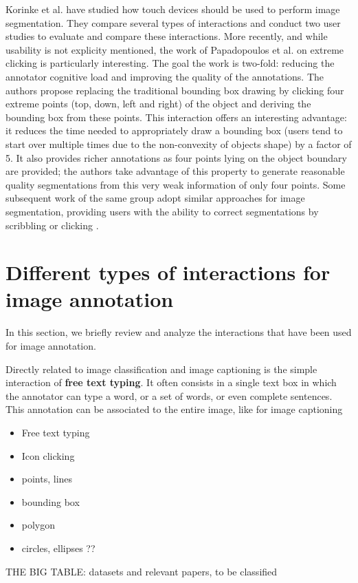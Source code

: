 Korinke et al. \cite{korinke_intuitive_2015,korinke_exploring_2015} have studied how touch devices should be used to perform image segmentation. They compare several types of interactions and conduct two user studies to evaluate and compare these interactions. More recently, and while usability is not explicity mentioned, the work of Papadopoulos et al. \cite{papadopoulos2017extreme} on extreme clicking is particularly interesting. The goal the work is two-fold: reducing the annotator cognitive load and improving the quality of the annotations. The authors propose replacing the traditional bounding box drawing by clicking four extreme points (top, down, left and right)  of the object and deriving the bounding box from these points. This interaction offers an interesting advantage: it reduces the time needed to appropriately draw a bounding box (users tend to start over multiple times due to the non-convexity of objects shape) by a factor of 5. It also provides richer annotations as four points lying on the object boundary are provided; the authors take advantage of this property to generate reasonable quality segmentations from this very weak information of only four points. Some subsequent work of the same group adopt similar approaches for image segmentation, providing users with the ability to correct segmentations by scribbling \cite{agustsson2018interactive} or clicking \cite{OpenImagesSegmentation}.


\section{Different types of interactions for image annotation}

In this section, we briefly review and analyze the interactions that have been used for image annotation. 

Directly related to image classification and image captioning is the simple interaction of \textbf{free text typing}. It often consists in a single text box in which the annotator can type a word, or a set of words, or even complete sentences. This annotation can be associated to the entire image, like for image captioning 

\begin{itemize}
	\item Free text typing
	\item Icon clicking
	\item points, lines
	\item bounding box
	\item polygon
	\item circles, ellipses ??
\end{itemize}


THE BIG TABLE: datasets and relevant papers, to be classified


